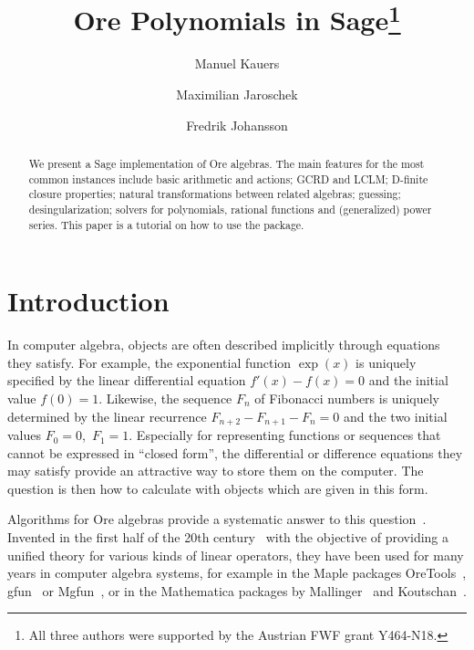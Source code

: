\documentclass{llncs}
\begin{document}
 \title{Ore Polynomials in Sage\thanks{All three authors were supported by the Austrian FWF grant Y464-N18.}}

 \author{Manuel Kauers\and Maximilian Jaroschek\and Fredrik Johansson}


 \maketitle

 \begin{abstract}
We present a Sage implementation of Ore algebras. The main features for the most
common instances include basic arithmetic and actions; GCRD and LCLM; D-finite
closure properties; natural transformations between related algebras; guessing;
desingularization; solvers for polynomials, rational functions and (generalized)
power series. This paper is a tutorial on how to use the package.
 \end{abstract}



\section{Introduction}

In computer algebra, objects are often described implicitly through equations
they satisfy. For example, the exponential function $\exp(x)$ is uniquely
specified by the linear differential equation $f'(x)-f(x)=0$ and the initial
value $f(0)=1$.  Likewise, the sequence $F_n$ of Fibonacci numbers is uniquely
determined by the linear recurrence $F_{n+2}-F_{n+1}-F_n=0$ and the two initial
values $F_0=0$,~$F_1=1$.  Especially for representing functions or sequences
that cannot be expressed in ``closed form'', the differential or difference
equations they may satisfy provide an attractive way to store them on the
computer. The question is then how to calculate with objects which are given in
this form.

Algorithms for Ore algebras provide a systematic answer to this
question~\cite{bronstein96,chyzak98}.  Invented in the first half of the 20th
century~\cite{ore33} with the objective of providing a unified theory for
various kinds of linear operators, they have been used for many years in
computer algebra systems, for example in the Maple packages
OreTools~\cite{abramov03}, gfun~\cite{salvy94} or Mgfun~\cite{chyzak98a}, or in
the Mathematica packages by Mallinger~\cite{mallinger96} and
Koutschan~\cite{koutschan10c,koutschan09}.
\end{document}
